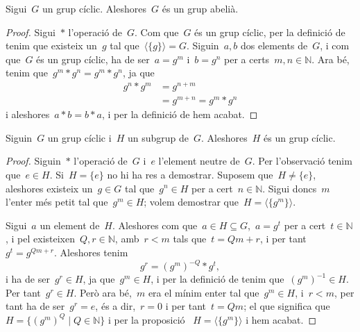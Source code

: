\documentclass[../../main.tex]{subfiles}
\begin{document}
    \begin{proposition}
        Sigui~\(G\) un grup cíclic.
        Aleshores~\(G\) és un grup abelià.
        \begin{proof}
            Sigui~\(\ast\) l'operació de~\(G\).
            Com que~\(G\) és un grup cíclic, per la definició de  tenim que existeix un~\(g\) tal que~\(\langle\{g\}\rangle=G\).
            Siguin~\(a,b\) dos  elements de~\(G\), i com que~\(G\) és un grup cíclic, ha de ser~\(a=g^{m}\) i~\(b=g^{n}\) per a certs~\(m,n\in\mathbb{N}\).
            Ara bé, tenim que~\(g^{m}\ast g^{n}=g^{m}\ast g^{n}\), ja que
            \begin{align*}
            g^{n}\ast g^{m}&=g^{n+m}\\
            &=g^{m+n}=g^{m}\ast g^{n}
            \end{align*}
            i aleshores~\(a\ast b=b\ast a\), i per la definició de  hem acabat.
        \end{proof}
    \end{proposition}
    \begin{proposition}
        Siguin~\(G\) un grup cíclic i~\(H\) un subgrup de~\(G\).
        Aleshores~\(H\) és un grup cíclic.
        \begin{proof}
            Siguin~\(\ast\) l'operació de~\(G\) i~\(e\) l'element neutre de~\(G\).
            Per l'observació  tenim que~\(e\in H\).
            Si~\(H=\{e\}\) no hi ha res a demostrar.
            Suposem que~\(H\neq\{e\}\), aleshores existeix un~\(g\in G\) tal que~\(g^{n}\in H\) per a cert~\(n\in\mathbb{N}\).
            Sigui doncs~\(m\) l'enter més petit tal que~\(g^{m}\in H\); volem demostrar que~\(H=\langle\{g^{m}\}\rangle\).

            Sigui~\(a\) un element de~\(H\).
            Aleshores com que~\(a\in H\subseteq G\),~\(a=g^{t}\) per a cert~\(t\in\mathbb{N}\), i pel  existeixen~\(Q,r\in\mathbb{N}\), amb~\(r<m\) tals que~\(t=Qm+r\), i per tant~\(g^{t}=g^{Qm+r}\).
            Aleshores tenim
            \[
                g^{r}=\left(g^{m}\right)^{-Q}\ast g^{t},
            \]
            i ha de ser~\(g^{r}\in H\), ja que~\(g^{m}\in H\), i per la definició de  tenim que~\(\left(g^{m}\right)^{-1}\in H\).
            Per tant~\(g^{r}\in H\).
            Però ara bé,~\(m\) era el mínim enter tal que~\(g^{m}\in H\), i~\(r<m\), per tant ha de ser~\(g^{r}=e\), és a dir,~\(r=0\) i per tant~\(t=Qm\); el que significa que~\(H=\{\left(g^{m}\right)^{Q}\mid Q\in\mathbb{N}\}\) i per la proposició ~\(H=\langle\{g^{m}\}\rangle\) i hem acabat.
        \end{proof}
    \end{proposition}
\end{document}
